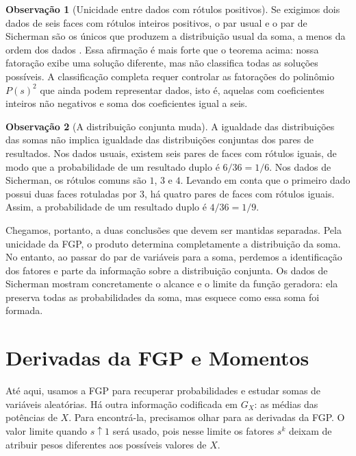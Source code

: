 \documentclass[12pt,portuguese]{article}
\theoremstyle{definition}
\newtheorem{remark}[remark]{Observação}
\theoremstyle{plainexercise}
\theoremstyle{starredexercise}
\theoremstyle{definition}
\begin{document}
\begin{remark}[Unicidade entre dados com rótulos positivos]\label{rem:unicidade-sicherman}
Se exigimos dois dados de seis faces com rótulos inteiros positivos,
o par usual e o par de Sicherman são os únicos que produzem a distribuição
usual da soma, a menos da ordem dos dados \cite{GallianRusin1979}.
Essa afirmação é mais forte que o teorema acima:
nossa fatoração exibe uma solução diferente,
mas não classifica todas as soluções possíveis.
A classificação completa requer controlar as fatorações do polinômio
$P(s)^2$ que ainda podem representar dados,
isto é, aquelas com coeficientes inteiros não negativos e soma dos
coeficientes igual a seis.
\end{remark}

\begin{remark}[A distribuição conjunta muda]\label{rem:conjunta-muda}
A igualdade das distribuições das somas não implica igualdade das
distribuições conjuntas dos pares de resultados.
Nos dados usuais, existem seis pares de faces com rótulos iguais,
de modo que a probabilidade de um resultado duplo é $6/36=1/6$.
Nos dados de Sicherman, os rótulos comuns são $1$, $3$ e $4$.
Levando em conta que o primeiro dado possui duas faces rotuladas por $3$,
há quatro pares de faces com rótulos iguais.
Assim, a probabilidade de um resultado duplo é $4/36=1/9$.
\end{remark}

Chegamos, portanto, a duas conclusões que devem ser mantidas separadas.
Pela unicidade da FGP,
o produto determina completamente a distribuição da soma.
No entanto, ao passar do par de variáveis para a soma,
perdemos a identificação dos fatores e parte da informação sobre a
distribuição conjunta.
Os dados de Sicherman mostram concretamente o alcance e o limite da função
geradora: ela preserva todas as probabilidades da soma,
mas esquece como essa soma foi formada.

\section{Derivadas da FGP e Momentos}\label{sec:momentos-fgp}

Até aqui, usamos a FGP para recuperar probabilidades e estudar somas de
variáveis aleatórias. Há outra informação codificada em $G_X$: as médias das
potências de $X$. Para encontrá-la, precisamos olhar para as derivadas da FGP.
O valor limite quando $s\uparrow1$ será usado, pois nesse limite os fatores
$s^k$ deixam de atribuir pesos diferentes aos possíveis valores de $X$.
\end{document}
